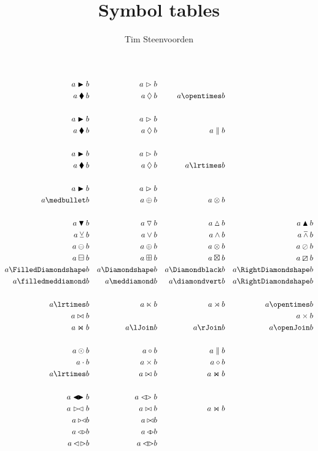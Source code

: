 \documentclass
  [a4paper
  ,justified
  ,nofonts
  ]{tufte-handout}
\begin{document}
\title{Symbol tables}
\author{Tim Steenvoorden}


\def\L{\blacktriangleleft}
\def\R{\blacktriangleright}
\def\l{\vartriangleleft}
\def\r{\vartriangleright}

\def\ior{\mathbin{\blacklozenge}}
\def\eor{\mathbin{\lozenge}}


\begin{align}
  a \R b && a \r b \\
  a \ior b && a \eor b && a \opentimes b \\
  \\
  a \R b && a \r b \\
  a \ior b && a \eor b && a \parallel b \\
  \\
  a \R b && a \r b \\
  a \ior b && a \eor b && a \lrtimes b \\
  \\
  a \R b && a \r b \\
  a \medbullet b && a \oplus b && a \otimes b \\
  \\
  a \mathbin{\blacktriangledown} b && a \mathbin{\triangledown} b && a \mathbin{\vartriangle} b && a \mathbin{\blacktriangle} b \\
  a \veebar b && a \vee b && a \wedge b && a \barwedge b \\
  a \ominus b && a \oplus b && a \otimes b && a \oslash b \\
  a \boxminus b && a \boxplus b && a \boxtimes b && a \boxslash b \\
  a \FilledDiamondshape b && a \Diamondshape b && a \Diamondblack b && a \RightDiamondshape b \\
  a \filledmeddiamond b && a \meddiamond b && a \diamondvert b && a \RightDiamondshape b \\
  \\
  a \lrtimes b && a \ltimes b && a \rtimes b && a \opentimes b \\
  a \bowtie b && && && a \times b \\
  a \Join b && a \lJoin b && a \rJoin b && a \openJoin b \\
  \\
  a \odot b && a \circ b && a \parallel b \\
  a \cdot b && a \times b && a \diamond b \\
  a \lrtimes b && a \bowtie b && a \Join b \\
  \\
  a \L\!\R b && a \l\!\r b \\
  a \r\!\l b && a \bowtie b && a \Join b \\
  a \triangleright\!\triangleleft b && a \triangleright\!\!\triangleleft b \\
  a \triangleleft\!\triangleright b && a \triangleleft\!\!\triangleright b \\
  a \lhd\!\rhd b && a \lhd\!\!\rhd b \\
\end{align}
\end{document}
